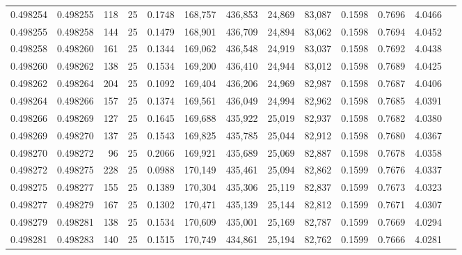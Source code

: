 \begin{tabular}{rrrrrrrrrrrrr}
0.498254 & 0.498255 & 118 &  25 &                                     0.1748 & 168,757 & 436,853 &  24,869 &  83,087 & 0.1598 & 0.7696 & 4.0466 \\
0.498255 & 0.498258 & 144 &  25 &                                     0.1479 & 168,901 & 436,709 &  24,894 &  83,062 & 0.1598 & 0.7694 & 4.0452 \\
0.498258 & 0.498260 & 161 &  25 &                                     0.1344 & 169,062 & 436,548 &  24,919 &  83,037 & 0.1598 & 0.7692 & 4.0438 \\
0.498260 & 0.498262 & 138 &  25 &                                     0.1534 & 169,200 & 436,410 &  24,944 &  83,012 & 0.1598 & 0.7689 & 4.0425 \\
0.498262 & 0.498264 & 204 &  25 &                                     0.1092 & 169,404 & 436,206 &  24,969 &  82,987 & 0.1598 & 0.7687 & 4.0406 \\
0.498264 & 0.498266 & 157 &  25 &                                     0.1374 & 169,561 & 436,049 &  24,994 &  82,962 & 0.1598 & 0.7685 & 4.0391 \\
0.498266 & 0.498269 & 127 &  25 &                                     0.1645 & 169,688 & 435,922 &  25,019 &  82,937 & 0.1598 & 0.7682 & 4.0380 \\
0.498269 & 0.498270 & 137 &  25 &                                     0.1543 & 169,825 & 435,785 &  25,044 &  82,912 & 0.1598 & 0.7680 & 4.0367 \\
0.498270 & 0.498272 &  96 &  25 &                                     0.2066 & 169,921 & 435,689 &  25,069 &  82,887 & 0.1598 & 0.7678 & 4.0358 \\
0.498272 & 0.498275 & 228 &  25 &                                     0.0988 & 170,149 & 435,461 &  25,094 &  82,862 & 0.1599 & 0.7676 & 4.0337 \\
0.498275 & 0.498277 & 155 &  25 &                                     0.1389 & 170,304 & 435,306 &  25,119 &  82,837 & 0.1599 & 0.7673 & 4.0323 \\
0.498277 & 0.498279 & 167 &  25 &                                     0.1302 & 170,471 & 435,139 &  25,144 &  82,812 & 0.1599 & 0.7671 & 4.0307 \\
0.498279 & 0.498281 & 138 &  25 &                                     0.1534 & 170,609 & 435,001 &  25,169 &  82,787 & 0.1599 & 0.7669 & 4.0294 \\
0.498281 & 0.498283 & 140 &  25 &                                     0.1515 & 170,749 & 434,861 &  25,194 &  82,762 & 0.1599 & 0.7666 & 4.0281 \\

\end{tabular}
